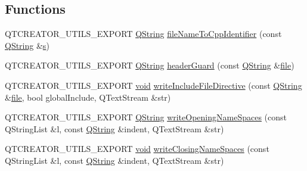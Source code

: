 \subsection*{\-Functions}
\begin{DoxyCompactItemize}
\item 
\-Q\-T\-C\-R\-E\-A\-T\-O\-R\-\_\-\-U\-T\-I\-L\-S\-\_\-\-E\-X\-P\-O\-R\-T \hyperlink{group___u_a_v_objects_plugin_gab9d252f49c333c94a72f97ce3105a32d}{\-Q\-String} \hyperlink{namespace_utils_a485be9a92787ac6067d4b6aee9c4d19c}{file\-Name\-To\-Cpp\-Identifier} (const \hyperlink{group___u_a_v_objects_plugin_gab9d252f49c333c94a72f97ce3105a32d}{\-Q\-String} \&\hyperlink{uavobjecttemplate_8m_a3691308f2a4c2f6983f2880d32e29c84}{s})
\item 
\-Q\-T\-C\-R\-E\-A\-T\-O\-R\-\_\-\-U\-T\-I\-L\-S\-\_\-\-E\-X\-P\-O\-R\-T \hyperlink{group___u_a_v_objects_plugin_gab9d252f49c333c94a72f97ce3105a32d}{\-Q\-String} \hyperlink{namespace_utils_ac52a000b5cec9305f2f39fa16f10b718}{header\-Guard} (const \hyperlink{group___u_a_v_objects_plugin_gab9d252f49c333c94a72f97ce3105a32d}{\-Q\-String} \&\hyperlink{uavobjecttemplate_8m_a97c04efa65bcf0928abf9260bc5cbf46}{file})
\item 
\-Q\-T\-C\-R\-E\-A\-T\-O\-R\-\_\-\-U\-T\-I\-L\-S\-\_\-\-E\-X\-P\-O\-R\-T \hyperlink{group___u_a_v_objects_plugin_ga444cf2ff3f0ecbe028adce838d373f5c}{void} \hyperlink{namespace_utils_aa128b664db6245a949180eeb33241e23}{write\-Include\-File\-Directive} (const \hyperlink{group___u_a_v_objects_plugin_gab9d252f49c333c94a72f97ce3105a32d}{\-Q\-String} \&\hyperlink{uavobjecttemplate_8m_a97c04efa65bcf0928abf9260bc5cbf46}{file}, bool global\-Include, \-Q\-Text\-Stream \&str)
\item 
\-Q\-T\-C\-R\-E\-A\-T\-O\-R\-\_\-\-U\-T\-I\-L\-S\-\_\-\-E\-X\-P\-O\-R\-T \hyperlink{group___u_a_v_objects_plugin_gab9d252f49c333c94a72f97ce3105a32d}{\-Q\-String} \hyperlink{namespace_utils_a4f9bdb87b689309d59ddefa4eb755238}{write\-Opening\-Name\-Spaces} (const \-Q\-String\-List \&l, const \hyperlink{group___u_a_v_objects_plugin_gab9d252f49c333c94a72f97ce3105a32d}{\-Q\-String} \&indent, \-Q\-Text\-Stream \&str)
\item 
\-Q\-T\-C\-R\-E\-A\-T\-O\-R\-\_\-\-U\-T\-I\-L\-S\-\_\-\-E\-X\-P\-O\-R\-T \hyperlink{group___u_a_v_objects_plugin_ga444cf2ff3f0ecbe028adce838d373f5c}{void} \hyperlink{namespace_utils_ad78c644f74183cea691888f986f111a7}{write\-Closing\-Name\-Spaces} (const \-Q\-String\-List \&l, const \hyperlink{group___u_a_v_objects_plugin_gab9d252f49c333c94a72f97ce3105a32d}{\-Q\-String} \&indent, \-Q\-Text\-Stream \&str)

\end{DoxyCompactItemize}
